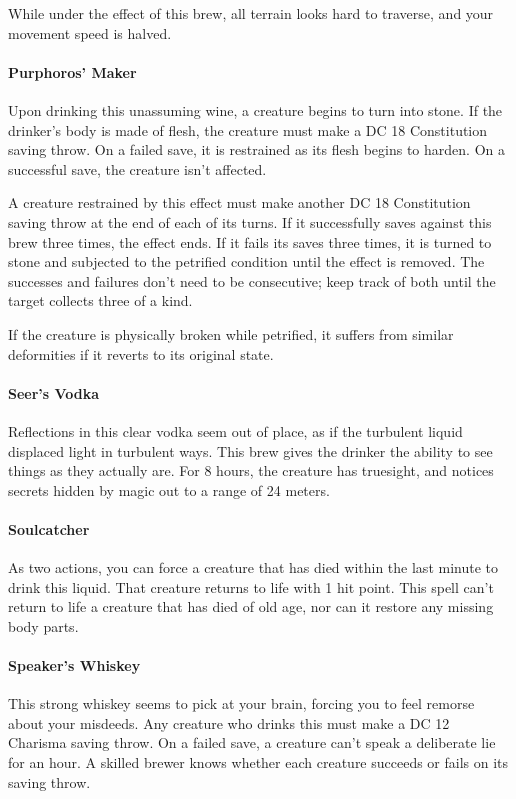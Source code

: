     While under the effect of this brew, all terrain looks hard to traverse, and your movement speed is halved.
\paragraph{Purphoros' Maker} %
    Upon drinking this unassuming wine, a creature begins to turn into stone.
    If the drinker's body is made of flesh, the creature must make a DC 18 Constitution saving throw.
    On a failed save, it is restrained as its flesh begins to harden.
    On a successful save, the creature isn't affected.

    A creature restrained by this effect must make another DC 18 Constitution saving throw at the end of each of its turns.
    If it successfully saves against this brew three times, the effect ends.
    If it fails its saves three times, it is turned to stone and subjected to the petrified condition until the effect is removed.
    The successes and failures don't need to be consecutive; keep track of both until the target collects three of a kind.

    If the creature is physically broken while petrified, it suffers from similar deformities if it reverts to its original state.
\paragraph{Seer's Vodka} %
    Reflections in this clear vodka seem out of place, as if the turbulent liquid displaced light in turbulent ways.
    This brew gives the drinker the ability to see things as they actually are.
    For 8 hours, the creature has truesight, and notices secrets hidden by magic out to a range of 24 meters.
\paragraph{Soulcatcher} %
    As two actions, you can force a creature that has died within the last minute to drink this liquid.
    That creature returns to life with 1 hit point.
    This spell can't return to life a creature that has died of old age, nor can it restore any missing body parts.
\paragraph{Speaker's Whiskey} %
    This strong whiskey seems to pick at your brain, forcing you to feel remorse about your misdeeds.
    Any creature who drinks this must make a DC 12 Charisma saving throw.
    On a failed save, a creature can't speak a deliberate lie for an hour.
    A skilled brewer knows whether each creature succeeds or fails on its saving throw.

